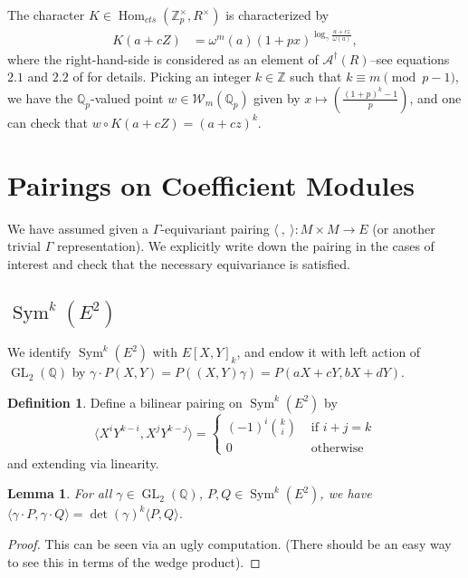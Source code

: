 \documentclass[10pt]{amsart}
\theoremstyle{plain}
\newtheorem{lemma}[theorem]{Lemma}
\theoremstyle{definition}
\newtheorem{definition}[theorem]{Definition}
\newcommand{\ZZ}{{\mathbb{Z}}}
\newcommand{\QQ}{{\mathbb{Q}}}
\newcommand{\cA}{\mathcal{A}}
\newcommand{\cW}{\mathcal{W}}
\DeclareMathOperator{\Hom}{Hom}
\DeclareMathOperator{\GL}{GL}
\DeclareMathOperator{\Sym}{Sym}
\begin{document}
The character $K\in\Hom_{cts}(\ZZ_p^\times,R^\times)$ is characterized by
\begin{align*}
	K(a+cZ)  &= \omega^m(a) (1+px)^{\log_\gamma\frac{a+cz}{\omega(a)}},
\end{align*}
where the right-hand-side is considered as an element of $\cA^\dagger(R)$--see equations $2.1$ and $2.2$ of \cite{Robs} for details. Picking an integer $k\in\ZZ$ such that $k\equiv m\pmod{p-1}$, we have the $\QQ_p$-valued point $w\in \cW_m(\QQ_p)$ given by $x\mapsto \left(\frac{(1+p)^k-1}{p}\right)$, and one can check that $w\circ K (a+cZ) = (a+cz)^k$.



\section{Pairings on Coefficient Modules} \label{sec:coeff_pairing}

We have assumed given a $\Gamma$-equivariant pairing $\langle~,~ \rangle : M \times M \longrightarrow E$ (or another trivial $\Gamma$ representation). We explicitly write down the pairing in the cases of interest and check that the necessary equivariance is satisfied. 

\subsection{$\Sym^k(E^2)$}

We identify $\Sym^k(E^2)$ with $E[X,Y]_k$, and endow it with left action of $\GL_2(\QQ)$ by $\gamma \cdot P(X,Y) = P((X,Y)\gamma)=P(aX+cY,bX+dY).$ 
\begin{definition}
Define a bilinear pairing on $\Sym^k(E^2)$ by
\begin{equation*}
	\langle X^iY^{k-i}, X^j Y^{k-j} \rangle = \begin{cases} (-1)^i {k \choose i} & \text{ if } i+j=k\\
												0	& \text{ otherwise} \end{cases}
\end{equation*}
and extending via linearity.
\end{definition}


\begin{lemma}
For all $\gamma\in \GL_2(\QQ)$, $P,Q\in\Sym^k(E^2)$, we have $\langle \gamma\cdot P,\gamma \cdot Q\rangle = \det(\gamma)^k \langle P,Q\rangle$.
\end{lemma}
\begin{proof}
This can be seen via an ugly computation. (There should be an easy way to see this in terms of the wedge product).
\end{proof}
\end{document}
